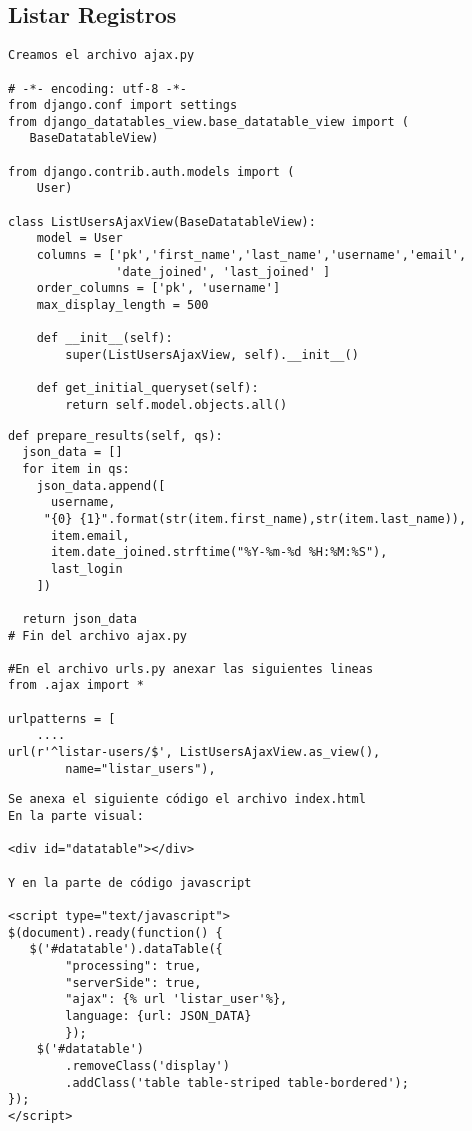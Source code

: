 \documentclass[xcolor=dvipsnames]{beamer}
\begin{document}
\subsection{Listar Registros}
\begin{frame}[fragile]
\begin{verbatim}
Creamos el archivo ajax.py

# -*- encoding: utf-8 -*-
from django.conf import settings
from django_datatables_view.base_datatable_view import (
   BaseDatatableView)
   
from django.contrib.auth.models import (
    User)

class ListUsersAjaxView(BaseDatatableView):
    model = User
    columns = ['pk','first_name','last_name','username','email',
               'date_joined', 'last_joined' ]
    order_columns = ['pk', 'username']
    max_display_length = 500
    
    def __init__(self):
        super(ListUsersAjaxView, self).__init__()

    def get_initial_queryset(self):
        return self.model.objects.all()

\end{verbatim}
\end{frame}

\begin{frame}[fragile]
\begin{verbatim}
def prepare_results(self, qs):
  json_data = []
  for item in qs:
    json_data.append([
      username,
     "{0} {1}".format(str(item.first_name),str(item.last_name)),
      item.email,
      item.date_joined.strftime("%Y-%m-%d %H:%M:%S"),
      last_login                
    ])
            
  return json_data
# Fin del archivo ajax.py

#En el archivo urls.py anexar las siguientes lineas
from .ajax import *

urlpatterns = [
    ....
url(r'^listar-users/$', ListUsersAjaxView.as_view(),
        name="listar_users"),
\end{verbatim}
\end{frame}

\begin{frame}[fragile]
\begin{verbatim}
Se anexa el siguiente código el archivo index.html
En la parte visual:

<div id="datatable"></div>

Y en la parte de código javascript

<script type="text/javascript">
$(document).ready(function() {
   $('#datatable').dataTable({
        "processing": true,
        "serverSide": true,
        "ajax": {% url 'listar_user'%},
        language: {url: JSON_DATA}
        });
    $('#datatable')
        .removeClass('display')
        .addClass('table table-striped table-bordered');
});
</script>
\end{verbatim}
\end{frame}
\end{document}
